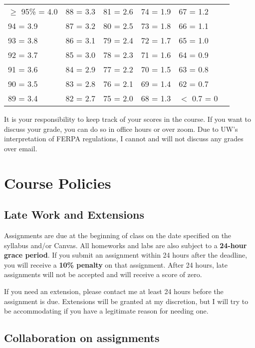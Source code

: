 \documentclass[12pt, letterpaper]{article}
\providecommand{\lsptoprule}{\midrule\toprule}
\providecommand{\lspbottomrule}{\bottomrule\midrule}
\begin{document}
\begin{longtable}{llllll}
    \lsptoprule
    $\geq$ 95\% = 4.0 & 88 = 3.3 & 81 = 2.6 & 74 = 1.9 & 67 = 1.2 \\
    94 = 3.9 & 87 = 3.2 & 80 = 2.5 & 73 = 1.8 & 66 = 1.1 \\
    93 = 3.8 & 86 = 3.1 & 79 = 2.4 & 72 = 1.7 & 65 = 1.0 \\
    92 = 3.7 & 85 = 3.0 & 78 = 2.3 & 71 = 1.6 & 64 = 0.9 \\
    91 = 3.6 & 84 = 2.9 & 77 = 2.2 & 70 = 1.5 & 63 = 0.8 \\
    90 = 3.5 & 83 = 2.8 & 76 = 2.1 & 69 = 1.4 & 62 = 0.7 \\
    89 = 3.4 & 82 = 2.7 & 75 = 2.0 & 68 = 1.3 & $<$ 0.7 = 0 \\
    \lspbottomrule
\end{longtable}

It is your responsibility to keep track of your scores in the course. If you want to discuss your grade, you can do so in office hours or over zoom. Due to UW’s interpretation of FERPA regulations, I cannot and will not discuss any grades over email.

\section*{Course Policies} \label{sec:policies}

\subsection*{Late Work and Extensions} \label{sec:late_work}

Assignments are due at the beginning of class on the date specified on the syllabus and/or Canvas. All homeworks and labs are also subject to a \textbf{24-hour grace period}. If you submit an assignment within 24 hours after the deadline, you will receive a \textbf{10\% penalty} on that assignment. After 24 hours, late assignments will not be accepted and will receive a score of zero.

If you need an extension, please contact me at least 24 hours before the assignment is due. Extensions will be granted at my discretion, but I will try to be accommodating if you have a legitimate reason for needing one.

\subsection*{Collaboration on assignments} \label{sec:collaborate}
\end{document}
